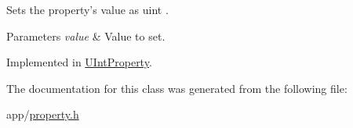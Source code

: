 Sets the property's value as uint . 


\begin{DoxyParams}{Parameters}
{\em value} & Value to set. \\
\hline
\end{DoxyParams}


Implemented in \hyperlink{class_u_int_property_a074ce84b6839d2451a3abee9da289198}{U\-Int\-Property}.



The documentation for this class was generated from the following file\-:\begin{DoxyCompactItemize}
\item 
app/\hyperlink{property_8h}{property.\-h}\end{DoxyCompactItemize}
